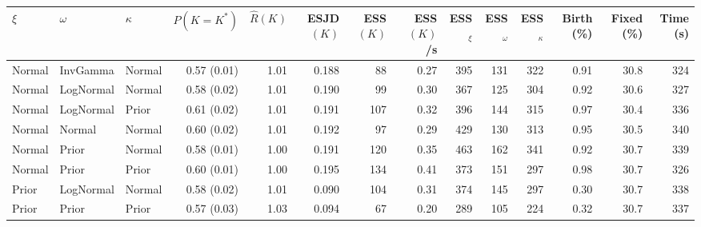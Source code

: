 
\begin{tabular}{l l l r r r r r r r r r r r}
  \toprule
  $\xi$ & $\omega$ & $\kappa$ & $P(K{=}K^*)$ & $\hat{R}(K)$ & ESJD$(K)$ & ESS$(K)$ & ESS$(K)$/s & ESS$_\xi$ & ESS$_\omega$ & ESS$_\kappa$ & Birth (\%) & Fixed (\%) & Time (s) \\
  \midrule
  Normal & InvGamma & Normal & 0.57 (0.01) & 1.01 & 0.188 & 88 & 0.27 & 395 & 131 & 322 & 0.91 & 30.8 & 324 \\
  Normal & LogNormal & Normal & 0.58 (0.02) & 1.01 & 0.190 & 99 & 0.30 & 367 & 125 & 304 & 0.92 & 30.6 & 327 \\
  Normal & LogNormal & Prior & 0.61 (0.02) & 1.01 & 0.191 & 107 & 0.32 & 396 & 144 & 315 & 0.97 & 30.4 & 336 \\
  Normal & Normal & Normal & 0.60 (0.02) & 1.01 & 0.192 & 97 & 0.29 & 429 & 130 & 313 & 0.95 & 30.5 & 340 \\
  Normal & Prior & Normal & 0.58 (0.01) & 1.00 & 0.191 & 120 & 0.35 & 463 & 162 & 341 & 0.92 & 30.7 & 339 \\
  Normal & Prior & Prior & 0.60 (0.01) & 1.00 & 0.195 & 134 & 0.41 & 373 & 151 & 297 & 0.98 & 30.7 & 326 \\
  Prior & LogNormal & Normal & 0.58 (0.02) & 1.01 & 0.090 & 104 & 0.31 & 374 & 145 & 297 & 0.30 & 30.7 & 338 \\
  Prior & Prior & Prior & 0.57 (0.03) & 1.03 & 0.094 & 67 & 0.20 & 289 & 105 & 224 & 0.32 & 30.7 & 337 \\
  \bottomrule
\end{tabular}

